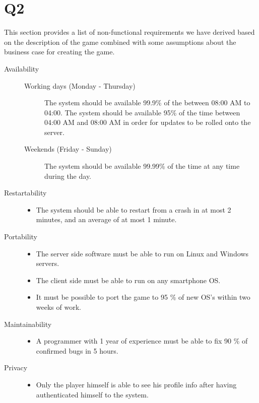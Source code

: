 \section{Q2}
This section provides a list of non-functional requirements we have derived based on the description of the game combined with some assumptions about the business case for creating the game.
\begin{description}

\item [Availability] \hfill 
	\begin{description}
		\item[Working days (Monday - Thursday)] The system should be available 99.9\% of the between 08:00 AM to 04:00. The system should be available 95\% of the time between 04:00 AM and 08:00 AM in order for updates to be rolled onto the server.
		\item[Weekends (Friday - Sunday)] The system should be available 99.99\% of the time at any time during the day. 
	\end{description}

\item [Restartability] \hfill 
	\begin{itemize}
	   \item The system should be able to restart from a crash in at most 2 minutes, and an average of at most 1 minute.
	\end{itemize}

\item [Portability] \hfill 
	\begin{itemize}
		\item The server side software must be able to run on Linux and Windows servers.
		\item The client side must be able to run on any smartphone OS.
		\item It must be possible to port the game to 95 \% of new OS's within two weeks of work.
	\end{itemize}

\item [Maintainability] \hfill 
	\begin{itemize}
	  	\item A programmer with 1 year of experience must be able to fix 90 \% of confirmed bugs in 5 hours.
	\end{itemize}



\item [Privacy] \hfill 
	\begin{itemize}
		\item Only the player himself is able to see his profile info after having authenticated himself to the system.
	\end{itemize}


\end{description}
